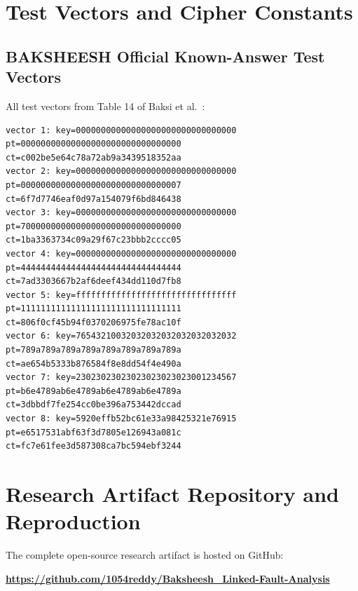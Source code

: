\appendix

\chapter{Test Vectors and Cipher Constants}
\label{app:vectors}

\section{BAKSHEESH Official Known-Answer Test Vectors}
All test vectors from Table 14 of Baksi et al.~\cite{baksi2023baksheesh}:
\begin{lstlisting}[basicstyle=\ttfamily\scriptsize]
vector 1: key=00000000000000000000000000000000  pt=00000000000000000000000000000000  ct=c002be5e64c78a72ab9a3439518352aa
vector 2: key=00000000000000000000000000000000  pt=00000000000000000000000000000007  ct=6f7d7746eaf0d97a154079f6bd846438
vector 3: key=00000000000000000000000000000000  pt=70000000000000000000000000000000  ct=1ba3363734c09a29f67c23bbb2cccc05
vector 4: key=00000000000000000000000000000000  pt=44444444444444444444444444444444  ct=7ad3303667b2af6deef434dd110d7fb8
vector 5: key=ffffffffffffffffffffffffffffffff  pt=11111111111111111111111111111111  ct=806f0cf45b94f0370206975fe78ac10f
vector 6: key=76543210032032032032032032032032  pt=789a789a789a789a789a789a789a789a  ct=ae654b5333b876584f8e8dd54f4e490a
vector 7: key=23023023023023023023023001234567  pt=b6e4789ab6e4789ab6e4789ab6e4789a  ct=3dbbdf7fe254cc0be396a753442dccad
vector 8: key=5920effb52bc61e33a98425321e76915  pt=e6517531abf63f3d7805e126943a081c  ct=fc7e61fee3d587308ca7bc594ebf3244
\end{lstlisting}

\chapter{Research Artifact Repository and Reproduction}
\label{app:reproduction}
The complete open-source research artifact is hosted on GitHub:
\begin{center}
\textbf{\url{https://github.com/1054reddy/Baksheesh_Linked-Fault-Analysis}}
\end{center}

